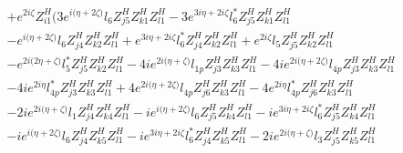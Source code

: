 \begin{align}
 &+e^{2 i \zeta } Z_{{i 1}}^{H} \Big(3 e^{i \Big(\eta +2 \zeta \Big)} l_6 Z_{{j 5}}^{H} Z_{{k 1}}^{H} Z_{{l 1}}^{H} -3 e^{3 i \eta +2 i \zeta } l_6^* Z_{{j 5}}^{H} Z_{{k 1}}^{H} Z_{{l 1}}^{H} \nonumber \\ 
 &- e^{i \Big(\eta +2 \zeta \Big)} l_6 Z_{{j 4}}^{H} Z_{{k 2}}^{H} Z_{{l 1}}^{H} +e^{3 i \eta +2 i \zeta } l_6^* Z_{{j 4}}^{H} Z_{{k 2}}^{H} Z_{{l 1}}^{H} +e^{2 i \zeta } l_5 Z_{{j 5}}^{H} Z_{{k 2}}^{H} Z_{{l 1}}^{H} \nonumber \\ 
 &- e^{2 i \Big(2 \eta +\zeta \Big)} l_5^* Z_{{j 5}}^{H} Z_{{k 2}}^{H} Z_{{l 1}}^{H} -4 i e^{2 i \Big(\eta +\zeta \Big)} l_{1p} Z_{{j 3}}^{H} Z_{{k 3}}^{H} Z_{{l 1}}^{H} -4 i e^{2 i \Big(\eta +2 \zeta \Big)} l_{4p} Z_{{j 3}}^{H} Z_{{k 3}}^{H} Z_{{l 1}}^{H} \nonumber \\ 
 &-4 i e^{2 i \eta } l_{4p}^* Z_{{j 3}}^{H} Z_{{k 3}}^{H} Z_{{l 1}}^{H} +4 e^{2 i \Big(\eta +2 \zeta \Big)} l_{4p} Z_{{j 6}}^{H} Z_{{k 3}}^{H} Z_{{l 1}}^{H} -4 e^{2 i \eta } l_{4p}^* Z_{{j 6}}^{H} Z_{{k 3}}^{H} Z_{{l 1}}^{H} \nonumber \\ 
 &-2 i e^{2 i \Big(\eta +\zeta \Big)} l_1 Z_{{j 4}}^{H} Z_{{k 4}}^{H} Z_{{l 1}}^{H} -i e^{i \Big(\eta +2 \zeta \Big)} l_6 Z_{{j 5}}^{H} Z_{{k 4}}^{H} Z_{{l 1}}^{H} -i e^{3 i \eta +2 i \zeta } l_6^* Z_{{j 5}}^{H} Z_{{k 4}}^{H} Z_{{l 1}}^{H} \nonumber \\ 
 &-i e^{i \Big(\eta +2 \zeta \Big)} l_6 Z_{{j 4}}^{H} Z_{{k 5}}^{H} Z_{{l 1}}^{H} -i e^{3 i \eta +2 i \zeta } l_6^* Z_{{j 4}}^{H} Z_{{k 5}}^{H} Z_{{l 1}}^{H} -2 i e^{2 i \Big(\eta +\zeta \Big)} l_3 Z_{{j 5}}^{H} Z_{{k 5}}^{H} Z_{{l 1}}^{H} \nonumber 
\end{align} 
